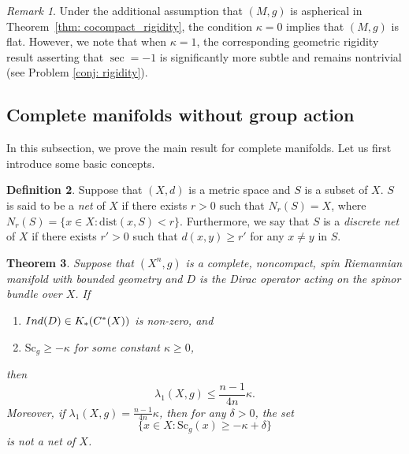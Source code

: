 \documentclass[12pt, reqno]{amsart}
\theoremstyle{plain}%
\newtheorem{theorem}{Theorem}[section]
\theoremstyle{definition}
\newtheorem{definition}[theorem]{Definition}
\theoremstyle{remark}
\newtheorem{remark}[theorem]{Remark}
\numberwithin{equation}{section}
\newcommand{\Sc}{\mathrm{Sc}}
\newcommand{\dist}{\mathrm{dist}}
\newcommand{\ind}{\textup{Ind}}
\begin{document}
\begin{remark}
 Under the additional assumption that $(M, g)$ is aspherical in Theorem~\ref{thm: cocompact_rigidity}, the condition $\kappa = 0$ implies that $(M, g)$ is flat. However, we note that when $\kappa = 1$, the corresponding geometric rigidity result asserting that $\sec = -1$ is significantly more subtle and remains nontrivial (see Problem \ref{conj: rigidity}).
\end{remark}



\subsection{Complete manifolds without group action}
In this subsection, we prove the main result for complete manifolds. Let us first introduce some basic concepts.

\begin{definition}\label{def:net}
	Suppose that  $(X, d)$ is a metric space and $S$ is a subset of $X$. $S$ is said to be  a \emph{net} of $X$ if there exists $r>0$ such that $N_r(S)=X$, where $N_r(S) = \{x \in X: \dist(x, S) < r\}$. Furthermore, we say that $S$ is a \emph{discrete net} of $X$ if there exists $r'>0$ such that $d(x,y)\geq r'$ for any $x\ne y$ in $S$.
\end{definition}

\begin{theorem}\label{thm:complete}
	Suppose that $(X^n, g)$ is a complete, noncompact, spin Riemannian manifold with bounded geometry and  $D$ is the Dirac operator acting on the spinor bundle over $X$. If
	\begin{enumerate}
		\item $\ind(D)\in K_*(C^*(X))$ is non-zero, and
		\item $\Sc_{g}\geq -\kappa$ for some constant $\kappa\geq 0$,
	\end{enumerate} 
	then $$\lambda_1(X,g)\leq \frac{n-1}{4n}\kappa.$$
Moreover, if $\lambda_1(X,g)= \frac{n-1}{4n}\kappa$, then for any $\delta>0$, the set $$\{x\in X:\Sc_g(x)\geq -\kappa+\delta\}$$ is not a net of $X$.
\end{theorem}
\end{document}
